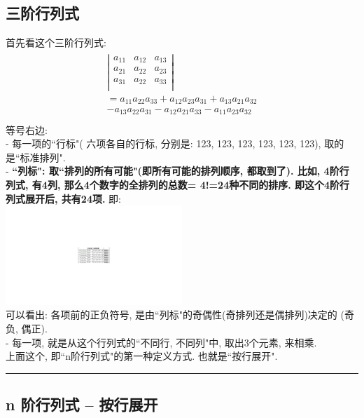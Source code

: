 \documentclass[UTF8]{ctexart}
\begin{document}
	\subsection{三阶行列式}
	首先看这个三阶行列式: 
	\begin{align*}
		\begin{matrix}
			\left| \begin{matrix}
				a_{11}&		a_{12}&		a_{13}\\
				a_{21}&		a_{22}&		a_{23}\\
				a_{31}&		a_{22}&		a_{33}\\
			\end{matrix} \right|\\
			=a_{11}a_{22}a_{33}+a_{12}a_{23}a_{31}+a_{13}a_{21}a_{32}\\
			-a_{13}a_{22}a_{31}-a_{12}a_{21}a_{33}-a_{11}a_{23}a_{32}\\
		\end{matrix}
	\end{align*} 
	等号右边: \\
	- 每一项的``行标"( 六项各自的行标, 分别是: 123, 123, 123, 123, 123, 123), 取的是``标准排列".	\\
	- \textbf{``列标": 取``排列的所有可能"(即所有可能的排列顺序, 都取到了). 比如, 4阶行列式, 有4列, 那么4个数字的全排列的总数= 4!=24种不同的排序. 即这个4阶行列式展开后, 共有24项.}  即: \\
	\includegraphics[width=0.5\textwidth]{img/0002.pdf}\\
	
	可以看出: 各项前的正负符号, 是由``列标"的奇偶性(奇排列还是偶排列)决定的 (奇负, 偶正).\\
	- 每一项, 就是从这个行列式的``不同行, 不同列"中, 取出3个元素, 来相乘.\\
	
	上面这个, 即``n阶行列式"的第一种定义方式. 也就是``按行展开".\\
	
	

	\hrule

	
	
	\subsection{n 阶行列式 -- 按行展开}
	
\end{document}
